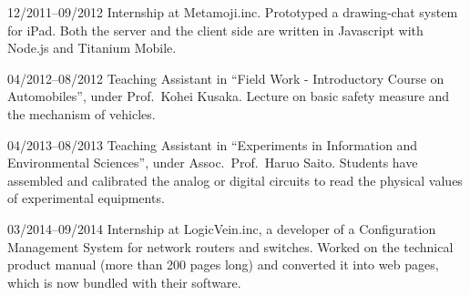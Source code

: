 \documentclass[letterpaper,12pt]{article}
\begin{document}
\begin{CV}

\item[12/2011--09/2012] Internship at Metamoji.inc.  Prototyped a
  drawing-chat system for iPad. Both the server and the client side are
  written in Javascript with Node.js and Titanium Mobile.

\item[04/2012--08/2012] Teaching Assistant in ``Field Work -
 Introductory Course on Automobiles'', under
 Prof.\ Kohei Kusaka.
 Lecture on basic safety measure and the mechanism of vehicles.
 
\item[04/2013--08/2013] Teaching Assistant in ``Experiments in
 Information and Environmental Sciences'', under
 Assoc.\ Prof.\ Haruo Saito.
 Students have assembled and calibrated the analog or digital
 circuits to read the physical values of experimental equipments.

\item[03/2014--09/2014] Internship at LogicVein.inc,
 a developer of a Configuration Management System
 for network routers and switches.
 Worked on %
 the technical product manual (more than 200 pages long) %
 and converted it into 
 web pages, which is now bundled with their software.
\end{CV}
\end{document}
